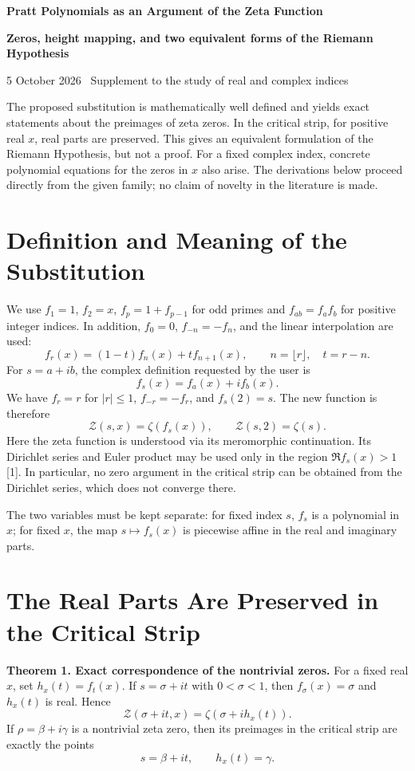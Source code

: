 \documentclass[11pt,a4paper]{article}
\newcommand{\Zcal}{\mathcal Z}
\begin{document}
\thispagestyle{fancy}

{\fontsize{27}{31}\selectfont\bfseries\color{navy}
Pratt Polynomials as an Argument of the Zeta Function\par}
\vspace{8pt}
{\large\bfseries Zeros, height mapping, and two equivalent forms of the Riemann Hypothesis\par}
\vspace{7pt}
{\large 5 October 2026 \textperiodcentered\ Supplement to the study of real and complex indices\par}

The proposed substitution is mathematically well defined and yields exact statements about the preimages of zeta zeros. In the critical strip, for positive real $x$, real parts are preserved. This gives an equivalent formulation of the Riemann Hypothesis, but not a proof. For a fixed complex index, concrete polynomial equations for the zeros in $x$ also arise. The derivations below proceed directly from the given family; no claim of novelty in the literature is made.

\section{Definition and Meaning of the Substitution}
We use $f_1=1$, $f_2=x$, $f_p=1+f_{p-1}$ for odd primes and $f_{ab}=f_af_b$ for positive integer indices. In addition, $f_0=0$, $f_{-n}=-f_n$, and the linear interpolation are used:
\[
 f_r(x)=(1-t)f_n(x)+t f_{n+1}(x),\qquad n=\lfloor r\rfloor,\quad t=r-n.
\]
For $s=a+ib$, the complex definition requested by the user is
\[
 f_s(x)=f_a(x)+i f_b(x).
\]
We have $f_r=r$ for $|r|\le1$, $f_{-r}=-f_r$, and $f_s(2)=s$. The new function is therefore
\[
 \Zcal(s,x)=\zeta(f_s(x)),\qquad \Zcal(s,2)=\zeta(s).
\]
Here the zeta function is understood via its meromorphic continuation. Its Dirichlet series and Euler product may be used only in the region $\Re f_s(x)>1$ [1]. In particular, no zero argument in the critical strip can be obtained from the Dirichlet series, which does not converge there.

The two variables must be kept separate: for fixed index $s$, $f_s$ is a polynomial in $x$; for fixed $x$, the map $s\mapsto f_s(x)$ is piecewise affine in the real and imaginary parts.

\section{The Real Parts Are Preserved in the Critical Strip}
\textbf{Theorem 1. Exact correspondence of the nontrivial zeros.}
For a fixed real $x$, set $h_x(t)=f_t(x)$. If $s=\sigma+it$ with $0<\sigma<1$, then $f_\sigma(x)=\sigma$ and $h_x(t)$ is real. Hence
\[
 \Zcal(\sigma+it,x)=\zeta\!\left(\sigma+i h_x(t)\right).
\]
If $\rho=\beta+i\gamma$ is a nontrivial zeta zero, then its preimages in the critical strip are exactly the points
\[
 s=\beta+it,\qquad h_x(t)=\gamma.
\]
\end{document}
